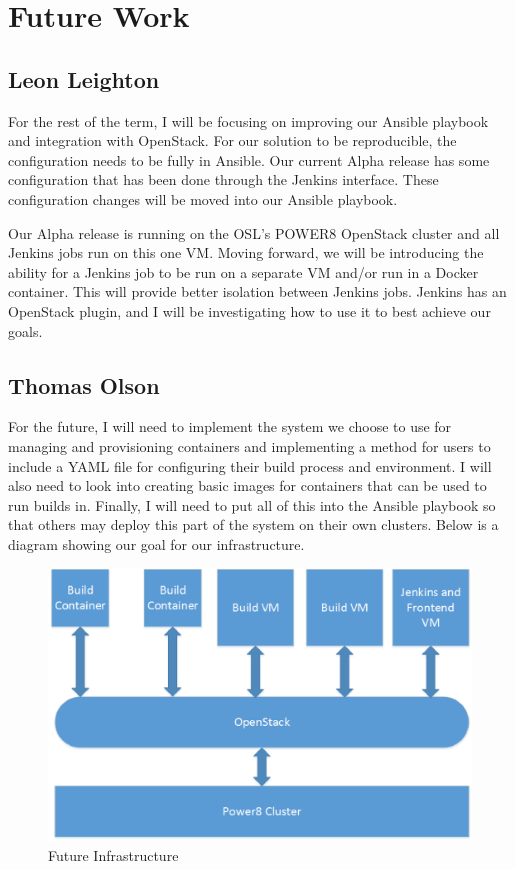 \documentclass[10pt,onecolumn,journal,draftclsnofoot]{IEEEtran}
\begin{document}
\section{Future Work}
\subsection{Leon Leighton}
For the rest of the term, I will be focusing on improving our Ansible playbook and integration with OpenStack.
For our solution to be reproducible, the configuration needs to be fully in Ansible.
Our current Alpha release has some configuration that has been done through the Jenkins interface.
These configuration changes will be moved into our Ansible playbook.

Our Alpha release is running on the OSL's POWER8 OpenStack cluster and all Jenkins jobs run on this one VM\@.
Moving forward, we will be introducing the ability for a Jenkins job to be run on a separate VM and/or run in a Docker container.
This will provide better isolation between Jenkins jobs.
Jenkins has an OpenStack plugin, and I will be investigating how to use it to best achieve our goals.

\subsection{Thomas Olson}
For the future, I will need to implement the system we choose to use for managing and provisioning containers and implementing a method for users to include a YAML file for configuring their build process and environment. I will also need to look into creating basic images for containers that can be used to run builds in. Finally, I will need to put all of this into the Ansible playbook so that others may deploy this part of the system on their own clusters. Below is a diagram showing our goal for our infrastructure.

\begin{figure}[H]
  \centering
  \includegraphics[width=\textwidth, keepaspectratio]{Infrastructure.eps}
  \caption{Future Infrastructure}
\end{figure}
\end{document}
